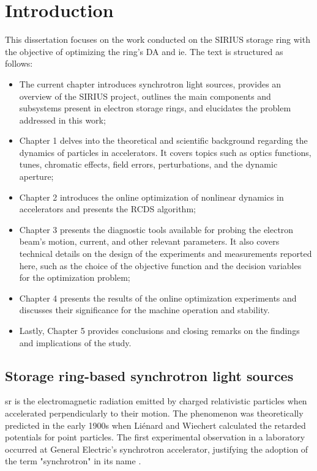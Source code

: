 \chapter*{Introduction}
\thispagestyle{plain}
\pagestyle{headings}
This dissertation focuses on the work conducted on the SIRIUS storage ring with the objective of optimizing the ring's \gls*{DA} and \gls*{ie}. The text is structured as follows:
\begin{itemize}
    \item The current chapter introduces synchrotron light sources, provides an overview of the SIRIUS project, outlines the main components and subsystems present in electron storage rings, and elucidates the problem addressed in this work;
    \item Chapter 1 delves into the theoretical and scientific background regarding the dynamics of particles in accelerators. It covers topics such as optics functions, tunes, chromatic effects, field errors, perturbations, and the dynamic aperture;
    \item Chapter 2 introduces the online optimization of nonlinear dynamics in accelerators and presents the \gls*{RCDS} algorithm;
    \item Chapter 3 presents the diagnostic tools available for probing the electron beam's motion, current, and other relevant parameters. It also covers technical details on the design of the experiments and measurements reported here, such as the choice of the objective function and the decision variables for the optimization problem;
    \item Chapter 4 presents the results of the online optimization experiments and discusses their significance for the machine operation and stability.
    \item Lastly, Chapter 5 provides conclusions and closing remarks on the findings and implications of the study.
\end{itemize}

\section*{Storage ring-based synchrotron light sources}

\gls*{sr} is the electromagnetic radiation emitted by charged relativistic particles when accelerated perpendicularly to their motion. The phenomenon was theoretically predicted in the early 1900s when Liénard and Wiechert calculated the retarded potentials for point particles. The first experimental observation in a laboratory occurred at General Electric's synchrotron accelerator, justifying the adoption of the term "synchrotron" in its name \cite{wiedemann_particle_2015}.

